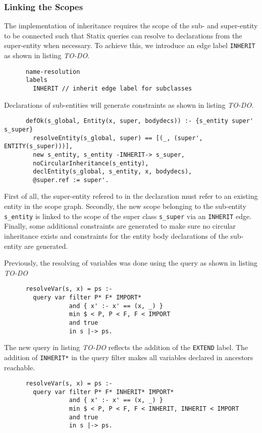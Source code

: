    \subsubsection{Linking the Scopes}
      The implementation of inheritance requires the scope of the sub- and super-entity to be connected such that Statix queries can resolve to declarations from the super-entity when necessary. To achieve this, we introduce an edge label \texttt{INHERIT} as shown in listing \emph{TO-DO}.
      \begin{lstlisting}
      name-resolution
      labels
        INHERIT // inherit edge label for subclasses
      \end{lstlisting}
      Declarations of sub-entities will generate constraints as shown in listing \emph{TO-DO}.
      \begin{lstlisting}
      defOk(s_global, Entity(x, super, bodydecs)) :- {s_entity super' s_super}
        resolveEntity(s_global, super) == [(_, (super', ENTITY(s_super)))],
        new s_entity, s_entity -INHERIT-> s_super,
        noCircularInheritance(s_entity),
        declEntity(s_global, s_entity, x, bodydecs),
        @super.ref := super'.
      \end{lstlisting}
      First of all, the super-entity refered to in the declaration must refer to an existing entity in the scope graph. Secondly, the new scope belonging to the sub-entity \texttt{s\_entity} is linked to the scope of the super class \texttt{s\_super} via an \texttt{INHERIT} edge. Finally, some additional constraints are generated to make sure no circular inheritance exists and constraints for the entity body declarations of the sub-entity are generated.

      Previously, the resolving of variables was done using the query as shown in listing \emph{TO-DO}
      \begin{lstlisting}
      resolveVar(s, x) = ps :-
        query var filter P* F* IMPORT*
                  and { x' :- x' == (x, _) }
                  min $ < P, P < F, F < IMPORT
                  and true
                  in s |-> ps.
      \end{lstlisting}
      The new query in listing \emph{TO-DO} reflects the addition of the \texttt{EXTEND} label. The addition of \texttt{INHERIT*} in the query filter makes all variables declared in ancestors reachable.
      \begin{lstlisting}
      resolveVar(s, x) = ps :-
        query var filter P* F* INHERIT* IMPORT*
                  and { x' :- x' == (x, _) }
                  min $ < P, P < F, F < INHERIT, INHERIT < IMPORT
                  and true
                  in s |-> ps.
      \end{lstlisting}

